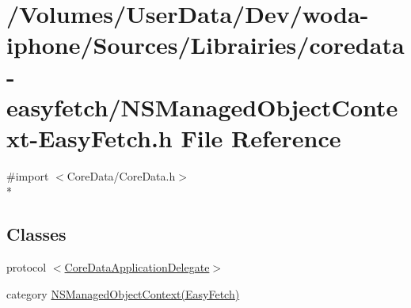 \hypertarget{_n_s_managed_object_context-_easy_fetch_8h}{\section{/\-Volumes/\-User\-Data/\-Dev/woda-\/iphone/\-Sources/\-Librairies/coredata-\/easyfetch/\-N\-S\-Managed\-Object\-Context-\/\-Easy\-Fetch.h File Reference}
\label{_n_s_managed_object_context-_easy_fetch_8h}
}
{\ttfamily \#import $<$Core\-Data/\-Core\-Data.\-h$>$}\\*
\subsection*{Classes}
\begin{DoxyCompactItemize}
\item 
protocol \hyperlink{protocol_core_data_application_delegate-p}{$<$\-Core\-Data\-Application\-Delegate$>$}
\item 
category \hyperlink{category_n_s_managed_object_context_07_easy_fetch_08}{N\-S\-Managed\-Object\-Context(\-Easy\-Fetch)}
\end{DoxyCompactItemize}

